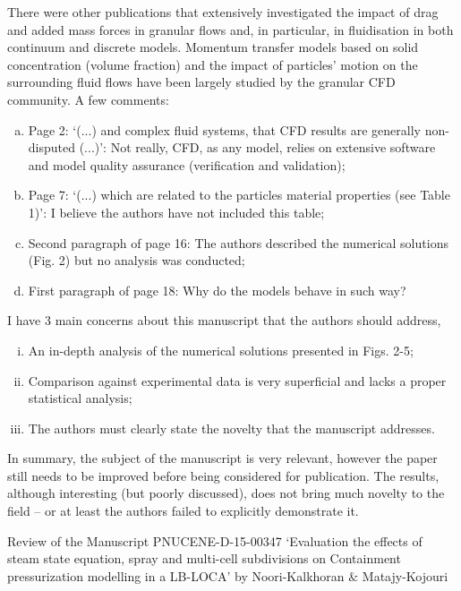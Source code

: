 \documentclass[14pt,twoside]{report}
\begin{document}
There were other publications that extensively investigated the impact of drag and added mass forces in granular flows and, in particular, in fluidisation in both continuum and discrete models. Momentum transfer models based on solid concentration (volume fraction) and the impact of particles' motion on the surrounding fluid flows have been largely studied by the granular CFD community. A few comments:
\begin{enumerate}[(a)] 
%
\item Page 2: `(...) and complex fluid systems, that CFD results are generally non-disputed (...)': Not really, CFD, as any model, relies on extensive software and model quality assurance (verification and validation); 
%
\item Page 7: `(...) which are related to the particles material properties (see Table 1)': I believe the authors have not included this table;
%
\item Second paragraph of page 16: The authors described the numerical solutions (Fig. 2) but no analysis was conducted;
%
\item First paragraph of page 18: Why do the models behave in such way? 
%
\end{enumerate}
I have 3 main concerns about this manuscript that the authors should address,
\begin{enumerate}[(i)]
\item An in-depth analysis of the numerical solutions presented in Figs. 2-5;
\item Comparison against experimental data is very superficial and lacks a proper statistical analysis;
\item The authors must clearly state the novelty that the manuscript addresses.
\end{enumerate}

In summary, the subject of the manuscript is very relevant, however the paper still needs to be improved before being considered for publication. The results, although interesting (but poorly discussed), does not bring much novelty to the field -- or at least the authors failed to explicitly demonstrate it. 

\clearpage




\begin{center}
  {\Large Review of the Manuscript PNUCENE-D-15-00347 `Evaluation the effects of steam state equation, spray and multi-cell subdivisions on Containment pressurization modelling in a LB-LOCA' by Noori-Kalkhoran $\&$ Matajy-Kojouri}
\end{center}
\end{document}
